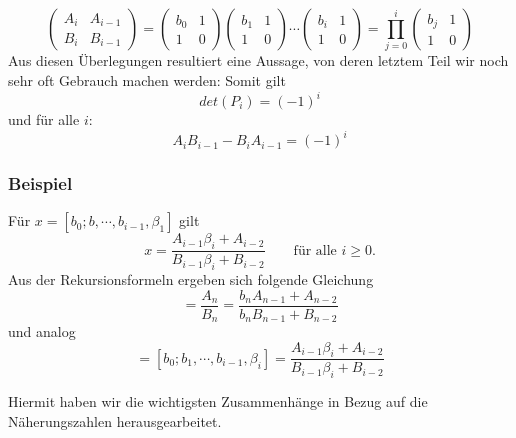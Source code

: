 \begin{beispiel}
\begin{equation}
		\begin{pmatrix}
			A_i&	A_{i-1}\\
			B_i&	B_{i-1}
		\end{pmatrix}
		=\begin{pmatrix}
			b_0	&	1\\
			1	&	0
		\end{pmatrix}
		\begin{pmatrix}
			b_1	&	1\\
			1	&	0
		\end{pmatrix}
		\cdots
		\begin{pmatrix}
			b_i	&	1\\
			1	&	0
		\end{pmatrix} 
		=\displaystyle\prod_{j=0}^{i}\begin{pmatrix}
			b_j	&	1\\
			1	&	0
		\end{pmatrix}
\end{equation}
Aus diesen Überlegungen resultiert eine Aussage, von deren letztem 
Teil wir noch sehr oft Gebrauch machen werden:
Somit gilt 
\begin{equation}
det(P_i) = (-1)^i
\end{equation}
und für alle $i$:
\begin{equation}
A_iB_{i-1} - B_iA_{i-1} = (-1)^i
\end{equation}
\subsubsection{Beispiel}
Für $x = [b_0;b,\cdots,b_{i-1},\beta_1]$ gilt
\begin{equation}
x = \frac{A_{i-1}\beta_i + A_{i-2}}{B_{i-1}\beta_i + B_{i-2}}
\qquad \text{für alle $i \ge 0$.}
\end{equation}
Aus der Rekursionsformeln ergeben sich folgende Gleichung
\begin{equation}
[b_0;b_1,\cdots,b_n]
=
\frac{A_n}{B_n} = \frac{b_nA_{n-1} + A_{n-2}}{b_nB_{n-1} + B_{n-2}}
\end{equation}
und analog
\begin{equation}
[b_0;b,\cdots,b_{i-1},\beta_1] = [b_0;b_1,\cdots,b_{i-1},\beta_i]
=
\frac{A_{i-1}\beta_i + A_{i-2}}{B_{i-1}\beta_i + B_{i-2}}
\end{equation}
\end{beispiel}
Hiermit haben wir die wichtigsten Zusammenhänge in Bezug auf die Näherungszahlen herausgearbeitet.

